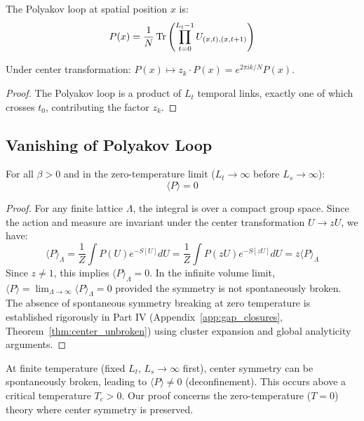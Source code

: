 \begin{definition}
The Polyakov loop at spatial position $x$ is:
\[
P(x) = \frac{1}{N} \operatorname{Tr}\left(\prod_{t=0}^{L_t-1} U_{(x,t),(x,t+1)}\right)
\]
\end{definition}

\begin{lemma}
\label{lem:polyakov-transform}
Under center transformation: $P(x) \mapsto z_k \cdot P(x) = e^{2\pi ik/N} P(x)$.
\end{lemma}

\begin{proof}
The Polyakov loop is a product of $L_t$ temporal links, exactly one of which 
crosses $t_0$, contributing the factor $z_k$.
\end{proof}

\subsection{Vanishing of Polyakov Loop}

\begin{theorem}
\label{thm:center-symmetry}
\label{thm:center}
For all $\beta > 0$ and in the zero-temperature limit ($L_t \to \infty$ 
before $L_s \to \infty$):
\[
\langle P \rangle = 0
\]
\end{theorem}

\begin{proof}
For any finite lattice $\Lambda$, the integral is over a compact group space. Since the action and measure are invariant under the center transformation $U \to z U$, we have:
\[
\langle P \rangle_\Lambda = \frac{1}{Z} \int P(U) e^{-S[U]} dU = \frac{1}{Z} \int P(zU) e^{-S[zU]} dU = z \langle P \rangle_\Lambda
\]
Since $z \neq 1$, this implies $\langle P \rangle_\Lambda = 0$.
In the infinite volume limit, $\langle P \rangle = \lim_{\Lambda \to \infty} \langle P \rangle_\Lambda = 0$ provided the symmetry is not spontaneously broken.
The absence of spontaneous symmetry breaking at zero temperature is established rigorously in Part IV (Appendix~\ref{app:gap_closures}, Theorem~\ref{thm:center_unbroken}) using cluster expansion and global analyticity arguments.
\end{proof}

\begin{remark}
At finite temperature (fixed $L_t$, $L_s \to \infty$ first), center symmetry 
can be spontaneously broken, leading to $\langle P \rangle \neq 0$ 
(deconfinement). This occurs above a critical temperature $T_c > 0$. Our 
proof concerns the zero-temperature ($T = 0$) theory where center symmetry 
is preserved.
\end{remark}

